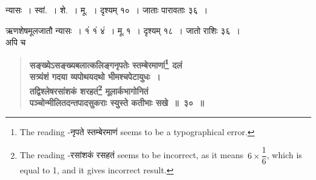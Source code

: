 \documentclass[11pt, openany]{book}
\makeatletter
\newcommand{\devanagarinumeral}[1]{%
	\devanagaridigits{\number \csname c@#1\endcsname}} %
\makeatother
\begin{document}
\afterpage{\fancyhead[RE,LO]{{\small{}}}}
\afterpage{\fancyhead[CE,CO]{({\small{~\thepage~}})}}
\afterpage{\fancyhead[LE,RO]{{\small{}}}}
\cfoot{}

\newpage
\renewcommand{\thepage}{\devanagarinumeral{page}}
\setcounter{page}{2}

\begin{sloppypar}
न्यासः~। स्वां.~। शे.~। मू.~। दृश्यम् १०~। जाताः पारावताः ३६~।
\vspace{2mm}

ऋणशेषमूलजातौ न्यासः~। १ं १ं ४ं~। मू.\,१~। दृश्यम् १८~। जातो राशिः ३६~।\\

अपि च\textendash 

 \label{Ex 1.30}
\begin{quote}
{\large \textbf{{\color{purple}सङ्ख्येऽसङ्ख्यबलात्कलिङ्गनृपतेः स्तम्बेरमाणां\renewcommand{\thefootnote}{१}\footnote{The reading -नृपते स्तम्बेरमाणं seems to be a typographical error.} दलं\\
सत्र्यंशं गदया व्यपोथयदथो भीमश्चपेटायुधः~।\\
तद्विश्लेषरसांशकं शरहतं\renewcommand{\thefootnote}{२}\footnote{The reading -रसांशकं रसहतं seems to be incorrect, as it means \,{\scriptsize $6 \times \dfrac{1}{6}$}, which is equal to 1, and it gives incorrect result.} मूलार्कभागोनितं\\
पञ्चोन्मीलितदन्तपादसुकराः स्युस्ते कतीभाः सखे~॥~३०~॥}}}
\end{quote}


\end{sloppypar}
\end{document}
